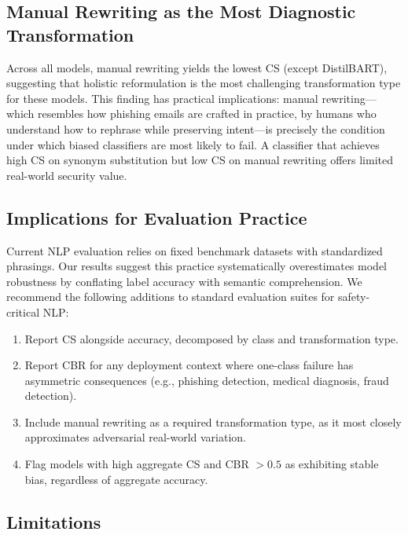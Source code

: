 \documentclass[11pt]{article}
\begin{document}
\subsection{Manual Rewriting as the Most Diagnostic Transformation}

Across all models, manual rewriting yields the lowest CS (except DistilBART), suggesting that holistic reformulation is the most challenging transformation type for these models. This finding has practical implications: manual rewriting---which resembles how phishing emails are crafted in practice, by humans who understand how to rephrase while preserving intent---is precisely the condition under which biased classifiers are most likely to fail. A classifier that achieves high CS on synonym substitution but low CS on manual rewriting offers limited real-world security value.

\subsection{Implications for Evaluation Practice}

Current NLP evaluation relies on fixed benchmark datasets with standardized phrasings. Our results suggest this practice systematically overestimates model robustness by conflating label accuracy with semantic comprehension. We recommend the following additions to standard evaluation suites for safety-critical NLP:

\begin{enumerate}[leftmargin=*, itemsep=3pt]
  \item Report CS alongside accuracy, decomposed by class and transformation type.
  \item Report CBR for any deployment context where one-class failure has asymmetric consequences (e.g., phishing detection, medical diagnosis, fraud detection).
  \item Include manual rewriting as a required transformation type, as it most closely approximates adversarial real-world variation.
  \item Flag models with high aggregate CS and CBR $> 0.5$ as exhibiting stable bias, regardless of aggregate accuracy.
\end{enumerate}

\subsection{Limitations}
\end{document}
